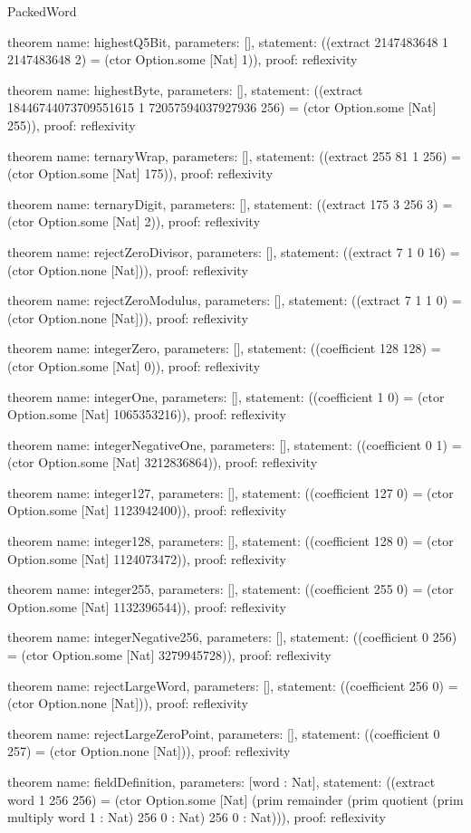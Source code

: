\begin{lexlean}{PackedWord}
\begin{semanticmodule}
theorem{
  name: highestQ5Bit,
  parameters: [],
  statement: ((extract 2147483648 1 2147483648 2) = (ctor Option.some [Nat] 1)),
  proof: reflexivity{}
}

theorem{
  name: highestByte,
  parameters: [],
  statement: ((extract 18446744073709551615 1 72057594037927936 256) = (ctor Option.some [Nat] 255)),
  proof: reflexivity{}
}

theorem{
  name: ternaryWrap,
  parameters: [],
  statement: ((extract 255 81 1 256) = (ctor Option.some [Nat] 175)),
  proof: reflexivity{}
}

theorem{
  name: ternaryDigit,
  parameters: [],
  statement: ((extract 175 3 256 3) = (ctor Option.some [Nat] 2)),
  proof: reflexivity{}
}

theorem{
  name: rejectZeroDivisor,
  parameters: [],
  statement: ((extract 7 1 0 16) = (ctor Option.none [Nat])),
  proof: reflexivity{}
}

theorem{
  name: rejectZeroModulus,
  parameters: [],
  statement: ((extract 7 1 1 0) = (ctor Option.none [Nat])),
  proof: reflexivity{}
}

theorem{
  name: integerZero,
  parameters: [],
  statement: ((coefficient 128 128) = (ctor Option.some [Nat] 0)),
  proof: reflexivity{}
}

theorem{
  name: integerOne,
  parameters: [],
  statement: ((coefficient 1 0) = (ctor Option.some [Nat] 1065353216)),
  proof: reflexivity{}
}

theorem{
  name: integerNegativeOne,
  parameters: [],
  statement: ((coefficient 0 1) = (ctor Option.some [Nat] 3212836864)),
  proof: reflexivity{}
}

theorem{
  name: integer127,
  parameters: [],
  statement: ((coefficient 127 0) = (ctor Option.some [Nat] 1123942400)),
  proof: reflexivity{}
}

theorem{
  name: integer128,
  parameters: [],
  statement: ((coefficient 128 0) = (ctor Option.some [Nat] 1124073472)),
  proof: reflexivity{}
}

theorem{
  name: integer255,
  parameters: [],
  statement: ((coefficient 255 0) = (ctor Option.some [Nat] 1132396544)),
  proof: reflexivity{}
}

theorem{
  name: integerNegative256,
  parameters: [],
  statement: ((coefficient 0 256) = (ctor Option.some [Nat] 3279945728)),
  proof: reflexivity{}
}

theorem{
  name: rejectLargeWord,
  parameters: [],
  statement: ((coefficient 256 0) = (ctor Option.none [Nat])),
  proof: reflexivity{}
}

theorem{
  name: rejectLargeZeroPoint,
  parameters: [],
  statement: ((coefficient 0 257) = (ctor Option.none [Nat])),
  proof: reflexivity{}
}

theorem{
  name: fieldDefinition,
  parameters: [word : Nat],
  statement: ((extract word 1 256 256) = (ctor Option.some [Nat] (prim remainder (prim quotient (prim multiply word 1 : Nat) 256 0 : Nat) 256 0 : Nat))),
  proof: reflexivity{}
}
\end{semanticmodule}
\end{lexlean}
